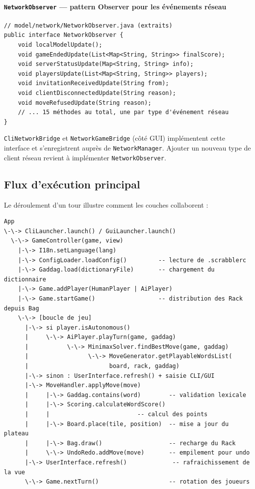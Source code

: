 \documentclass[a4paper]{article}
\begin{document}
\paragraph{\texttt{NetworkObserver} --- pattern Observer pour les événements réseau}
\begin{verbatim}
// model/network/NetworkObserver.java (extraits)
public interface NetworkObserver {
    void localModelUpdate();
    void gameEndedUpdate(List<Map<String, String>> finalScore);
    void serverStatusUpdate(Map<String, String> info);
    void playersUpdate(List<Map<String, String>> players);
    void invitationReceivedUpdate(String from);
    void clientDisconnectedUpdate(String reason);
    void moveRefusedUpdate(String reason);
    // ... 15 méthodes au total, une par type d'événement réseau
}
\end{verbatim}

\texttt{CliNetworkBridge} et \texttt{NetworkGameBridge} (côté GUI) implémentent cette interface et s'enregistrent auprès de \texttt{NetworkManager}. Ajouter un nouveau type de client réseau revient à implémenter \texttt{NetworkObserver}.

\subsection{Flux d'exécution principal}
Le déroulement d'un tour illustre comment les couches collaborent :

\begin{verbatim}
App
\-\-> CliLauncher.launch() / GuiLauncher.launch()
  \-\-> GameController(game, view)
    |-\-> I18n.setLanguage(lang)
    |-\-> ConfigLoader.loadConfig()         -- lecture de .scrabblerc
    |-\-> Gaddag.load(dictionaryFile)       -- chargement du dictionnaire
    |-\-> Game.addPlayer(HumanPlayer | AiPlayer)
    |-\-> Game.startGame()                  -- distribution des Rack depuis Bag
    \-\-> [boucle de jeu]
      |-\-> si player.isAutonomous()
      |     \-\-> AiPlayer.playTurn(game, gaddag)
      |           \-\-> MinimaxSolver.findBestMove(game, gaddag)
      |                 \-\-> MoveGenerator.getPlayableWordsList(
      |                       board, rack, gaddag)
      |-\-> sinon : UserInterface.refresh() + saisie CLI/GUI
      |-\-> MoveHandler.applyMove(move)
      |     |-\-> Gaddag.contains(word)        -- validation lexicale
      |     |-\-> Scoring.calculateWordScore()
      |     |                         -- calcul des points
      |     |-\-> Board.place(tile, position)  -- mise a jour du plateau
      |     |-\-> Bag.draw()                   -- recharge du Rack
      |     \-\-> UndoRedo.addMove(move)       -- empilement pour undo
      |-\-> UserInterface.refresh()             -- rafraichissement de la vue
      \-\-> Game.nextTurn()                    -- rotation des joueurs
\end{verbatim}
\end{document}
